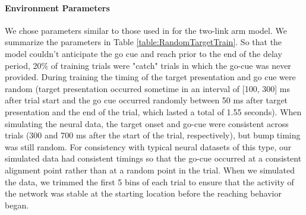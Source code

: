 \documentclass{article}
\begin{document}
\paragraph{Environment Parameters}
We chose parameters similar to those used in \cite{codol_motornet_2024} for the two-link arm model. We summarize the parameters in Table \ref{table:RandomTargetTrain}. So that the model couldn't anticipate the go cue and reach prior to the end of the delay period, 20\% of training trials were "catch" trials in which the go-cue was never provided. During training the timing of the target presentation and go cue were random (target presentation occurred sometime in an interval of [100, 300] ms after trial start and the go cue occurred randomly between 50 ms after target presentation and the end of the trial, which lasted a total of 1.55 seconds). When simulating the neural data, the target onset and go-cue were consistent across trials (300 and 700 ms after the start of the trial, respectively), but bump timing was still random. For consistency with typical neural datasets of this type, our simulated data had consistent timings so that the go-cue occurred at a consistent alignment point rather than at a random point in the trial. When we simulated the data, we trimmed the first 5 bins of each trial to ensure that the activity of the network was stable at the starting location before the reaching behavior began.
\end{document}
